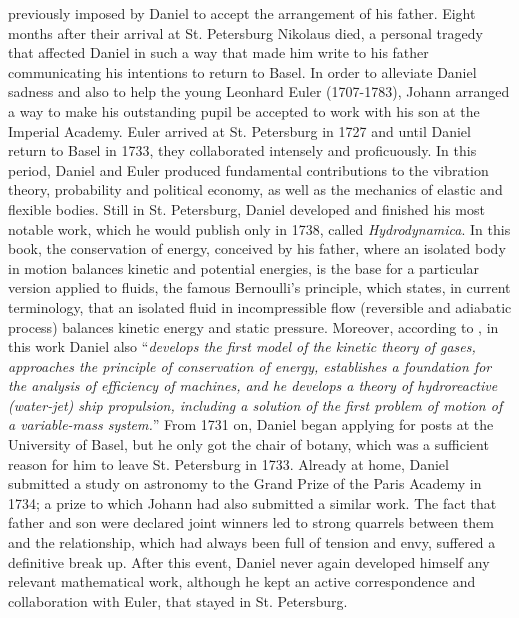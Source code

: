 previously imposed by Daniel to accept the arrangement of his father. Eight months after their arrival at St. Petersburg Nikolaus died, a personal tragedy that affected Daniel in such a way that made him write to his father communicating his intentions to return to Basel. In order to alleviate Daniel sadness and also to help the young Leonhard Euler (1707-1783), Johann arranged a way to make his outstanding pupil be accepted to work with his son at the Imperial Academy. Euler arrived at St. Petersburg in 1727 and until Daniel return to Basel in 1733, they collaborated intensely and proficuously. In this period, Daniel and Euler produced fundamental contributions to the vibration theory, probability and political economy, as well as the mechanics of elastic and flexible bodies. Still in St. Petersburg, Daniel developed and finished his most notable work, which he would publish only in 1738, called \emph{Hydrodynamica}. In this book, the conservation of energy, conceived by his father, where an isolated body in motion balances kinetic and potential energies, is the base for  a particular version applied to fluids, the famous Bernoulli's principle, which states, in current terminology, that an isolated fluid in incompressible flow (reversible and adiabatic process) balances kinetic energy and static pressure. Moreover, according to \cite{mikhailov_2005}, in this work Daniel also ``\emph{develops the first model of the kinetic theory of gases, approaches the principle of conservation of energy, establishes a foundation for the analysis of efficiency of machines, and he develops a theory of hydroreactive (water-jet) ship propulsion, including a solution of the first problem of motion of a variable-mass system.}'' From 1731 on, Daniel began applying for posts at the University of Basel, but he only got the chair of botany, which was a sufficient reason for him to leave St. Petersburg in 1733. Already at home, Daniel submitted a study on astronomy to the Grand Prize of the Paris Academy in 1734; a prize to which Johann had also submitted a similar work. The fact that father and son were declared joint winners led to strong quarrels between them and the relationship, which had always been full of tension and envy, suffered a definitive break up. After this event, Daniel never again developed himself any relevant mathematical work, although he kept an active correspondence and collaboration with Euler, that stayed in St. Petersburg.
